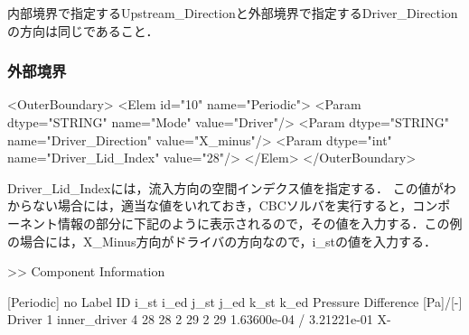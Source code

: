 内部境界で指定するUpstream\_Directionと外部境界で指定するDriver\_Directionの方向は同じであること．

\subsubsection{外部境界}

{ \small
\begin{program}
<OuterBoundary>
  <Elem id="10" name="Periodic">
    <Param dtype="STRING" name="Mode" value="Driver"/>
    <Param dtype="STRING" name="Driver_Direction" value="X_minus"/>
    <Param dtype="int"    name="Driver_Lid_Index" value="28"/>
  </Elem>
</OuterBoundary>
\end{program}
}

Driver\_Lid\_Indexには，流入方向の空間インデクス値を指定する．
この値がわからない場合には，適当な値をいれておき，CBCソルバを実行すると，コンポーネント情報の部分に下記のように表示されるので，その値を入力する．この例の場合には，X\_Minus方向がドライバの方向なので，i\_stの値を入力する．

{ \small
\begin{program}
>> Component Information

[Periodic]
 no            Label  ID  i_st  i_ed  j_st  j_ed  k_st  k_ed  Pressure Difference [Pa]/[-]  Driver
  1     inner_driver   4    28    28     2    29     2    29     1.63600e-04 / 3.21221e-01      X-
\end{program}
}

